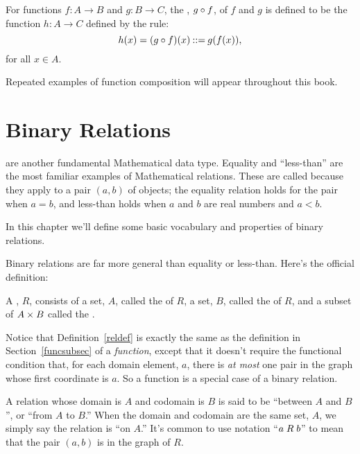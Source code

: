 \begin{definition}\label{func_compose_def}
  For functions $f:A \to B$ and $g:B \to C$,  the
  , $g \circ f$, of $f$ and $g$ is defined to be the
  function $h:A \to C$ defined by the rule:
\begin{displaymath}
h(x) = (g \circ f)(x) \mathbin{::=} g(f(x)),
\end{displaymath}
for all $x \in A$.
\end{definition}

Repeated examples of function composition will appear throughout this book.

\section{Binary Relations}

 are another fundamental Mathematical data type.  Equality
and ``less-than'' are the most familiar examples of Mathematical relations.
These are called  because they apply to a pair
$(a,b)$ of objects; the equality relation holds for the pair when $a=b$,
and less-than holds when $a$ and $b$ are real numbers and $a < b$.

In this chapter we'll define some basic vocabulary and properties of binary
relations.

Binary relations are far more general than equality or less-than.
Here's the official definition:
\begin{definition}\label{reldef}
A , $R$, consists of a set, $A$, called
the  of $R$, a set, $B$, called the  of $R$, and
a subset of $A \times B$ called the .
\end{definition}

Notice that Definition~\ref{reldef} is exactly the same as the definition
in Section~\ref{funcsubsec} of a {\emph{function}}, except that it doesn't
require the functional condition that, for each domain element, $a$, there
is \emph{at most} one pair in the graph whose first coordinate is $a$.  So
a function is a special case of a binary relation.

A relation whose domain is $A$ and codomain is $B$ is said to be
``between $A$ and $B$'', or ``from $A$ to $B$.''  When the domain and
codomain are the same set, $A$, we simply say the relation is ``on
$A$.''  It's common to use  notation ``$a \mathrel{R} b$'' to
mean that the pair $(a,b)$ is in the graph of $R$.

